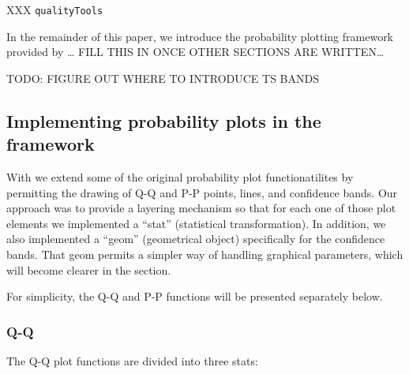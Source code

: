 XXX \texttt{qualityTools} \cite{qualityTools}

In the remainder of this paper, we introduce the probability plotting
framework provided by \ldots{} FILL THIS IN ONCE OTHER
SECTIONS ARE WRITTEN\ldots{}

TODO: FIGURE OUT WHERE TO INTRODUCE TS BANDS \citep{Aldor-Noiman2013-xw}

\subsection{\texorpdfstring{Implementing probability plots in the
framework}{Implementing probability plots in the  framework}}\label{implementing-probability-plots-in-the-framework}

With  we extend some of the original 
probability plot functionatilites by permitting the drawing of Q-Q and
P-P points, lines, and confidence bands. Our approach was to provide a
 layering mechanism so that for each one of those plot
elements we implemented a  ``stat'' (statistical
transformation). In addition, we also implemented a 
``geom'' (geometrical object) specifically for the confidence bands.
That geom permits a simpler way of handling graphical parameters, which
will become clearer in the  section.

For simplicity, the Q-Q and P-P functions will be presented separately
below.

\subsubsection{Q-Q}\label{q-q}

The Q-Q plot functions are divided into three stats:

